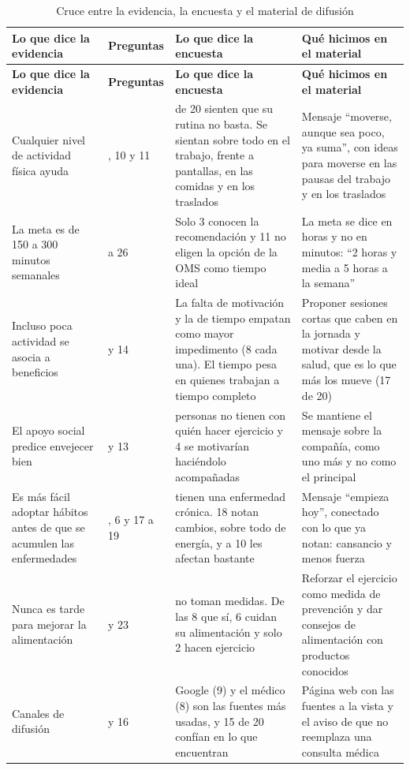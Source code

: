 \documentclass[12pt, letterpaper, table, xcdraw]{extarticle}
\renewcommand{\arraystretch}{2}
\newcommand{\leyendaFont}[1]{\fontsize{10}{12}\selectfont #1}
\begin{document}
{\footnotesize
\renewcommand{\arraystretch}{1.3}
\begin{longtable}{|>{\raggedright\arraybackslash}p{3.5cm}|>{\raggedright\arraybackslash}p{1.8cm}|>{\raggedright\arraybackslash}p{4.15cm}|>{\raggedright\arraybackslash}p{4.15cm}|}
    \caption{\leyendaFont{Cruce entre la evidencia, la encuesta y el material de difusión}}
    \label{tab:cruce}\\
    \hline
    \textbf{Lo que dice la evidencia} & \textbf{Preguntas} & \textbf{Lo que dice la encuesta} & \textbf{Qué hicimos en el material} \\ \hline
    \endfirsthead
    \hline
    \textbf{Lo que dice la evidencia} & \textbf{Preguntas} & \textbf{Lo que dice la encuesta} & \textbf{Qué hicimos en el material} \\ \hline
    \endhead
    Cualquier nivel de actividad física ayuda \parencite{morenoagostino2020} & 9, 10 y 11 & 13 de 20 sienten que su rutina no basta. Se sientan sobre todo en el trabajo, frente a pantallas, en las comidas y en los traslados & Mensaje ``moverse, aunque sea poco, ya suma'', con ideas para moverse en las pausas del trabajo y en los traslados \\ \hline
    La meta es de 150 a 300 minutos semanales \parencite{oms2020} & 24 a 26 & Solo 3 conocen la recomendación y 11 no eligen la opción de la OMS como tiempo ideal & La meta se dice en horas y no en minutos: ``2 horas y media a 5 horas a la semana'' \\ \hline
    Incluso poca actividad se asocia a beneficios \parencite{morenoagostino2020} & 12 y 14 & La falta de motivación y la de tiempo empatan como mayor impedimento (8 cada una). El tiempo pesa en quienes trabajan a tiempo completo & Proponer sesiones cortas que caben en la jornada y motivar desde la salud, que es lo que más los mueve (17 de 20) \\ \hline
    El apoyo social predice envejecer bien \parencite{bosnes2019} & 12 y 13 & 3 personas no tienen con quién hacer ejercicio y 4 se motivarían haciéndolo acompañadas & Se mantiene el mensaje sobre la compañía, como uno más y no como el principal \\ \hline
    Es más fácil adoptar hábitos antes de que se acumulen las enfermedades \parencite{zhu2025} & 5, 6 y 17 a 19 & 5 tienen una enfermedad crónica. 18 notan cambios, sobre todo de energía, y a 10 les afectan bastante & Mensaje ``empieza hoy'', conectado con lo que ya notan: cansancio y menos fuerza \\ \hline
    Nunca es tarde para mejorar la alimentación \parencite{zhou2023} & 22 y 23 & 12 no toman medidas. De las 8 que sí, 6 cuidan su alimentación y solo 2 hacen ejercicio & Reforzar el ejercicio como medida de prevención y dar consejos de alimentación con productos conocidos \\ \hline
    Canales de difusión & 15 y 16 & Google (9) y el médico (8) son las fuentes más usadas, y 15 de 20 confían en lo que encuentran & Página web con las fuentes a la vista y el aviso de que no reemplaza una consulta médica \\ \hline
\end{longtable}
}
\clearpage
\end{document}
